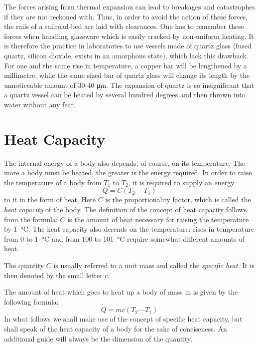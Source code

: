 The forces arising from thermal expansion can lead to breakages and catastrophes if they are not reckoned with. Thus, in order to avoid the action of these forces, the rails of a railroad-bed are laid with clearances. One has to remember these forces when handling glassware which is easily cracked by non-uniform heating. It is therefore the practice in laboratories to use vessels made of quartz glass (fused quartz, silicon dioxide, exists in an amorphous state), which lack this drawback. For one and the same rise in temperature, a copper bar will be lengthened by a millimetre, while the same sized bar of quartz glass will change its length by the unnoticeable amount of 30-40 \si{\micro\meter}. The expansion of quartz is so insignificant that a quartz vessel can be heated by several hundred degrees and then thrown into water without any fear.

\section{Heat Capacity}

The internal energy of a body also depends, of course, on its temperature. The more a body must be heated, the greater is the energy required. In order to raise the tem­perature of a body from $T_{1}$ to $T_{2}$, it is required to supply an energy
\begin{equation*}%
Q=C(T_{2}-T_{1})
\end{equation*}
to it in the form of heat. Here $C$ is the proportionality factor, which is called the \emph{heat capacity} of the body. The definition of the concept of heat capacity follows from the formula: $C$ is the amount of heat necessary for raising the temperature by \SI{1}{\celsius}. The heat capacity also derends on the temperature: rises in temperature from 0 to \SI{1}{\celsius} and from 100 to \SI{101}{\celsius} require somewhat different amounts of heat.

The quantity $C$ is usually referred to a unit mass and called the \emph{specific heat}. It is then denoted by the small letter $c$.

The amount of heat which goes to heat up a body of mass m is given by the following formula:
\begin{equation*}%
Q = mc (T_{2} — T_{1})
\end{equation*}
In what follows we shall make use of the concept of specific heat capacity, but shall speak of the heat capac­ity of a body for the sake of conciseness. An additional guide will always be the dimension of the quantity.

